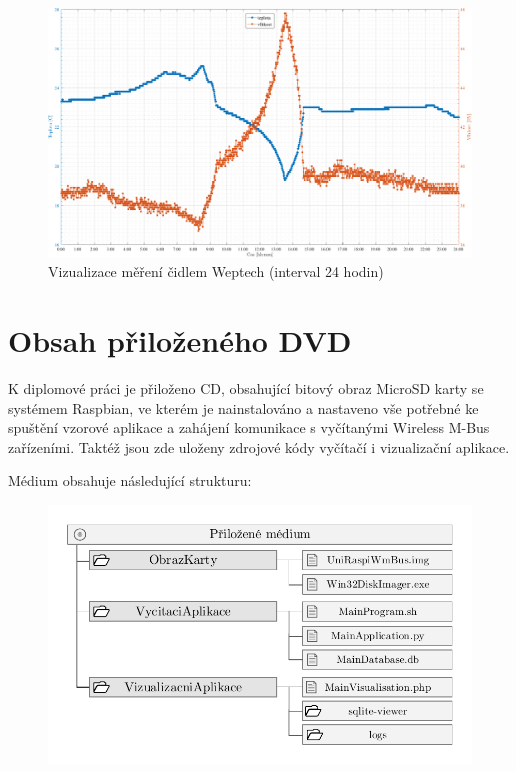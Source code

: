 \begin{landscape}
\begin{figure}[!ht]
  \begin{center}
    \includegraphics[scale=0.7]{graphs/VygenerujGrafWeptech}
  \end{center}
	\vspace{-20pt}
  \caption{Vizualizace měření čidlem Weptech (interval 24 hodin)}
	\label{GrafPriloha1}
\end{figure}
\end{landscape}

\chapter{Obsah přiloženého DVD}
\label{PrilohaMedium}
K diplomové práci je přiloženo CD, obsahující bitový obraz MicroSD karty se systémem Raspbian, ve kterém je nainstalováno a nastaveno vše potřebné ke spuštění vzorové aplikace a zahájení komunikace s vyčítanými Wireless M-Bus zařízeními. Taktéž jsou zde uloženy zdrojové kódy vyčítačí i vizualizační aplikace.

\vspace{10pt}
Médium obsahuje následující strukturu: 
\vspace{-20pt}
	 \begin{figure}[!h]
  \begin{center}
    \includegraphics[scale=0.8]{obrazky/priloha_medium}
  \end{center}
	\vspace{-30pt}
\end{figure}

